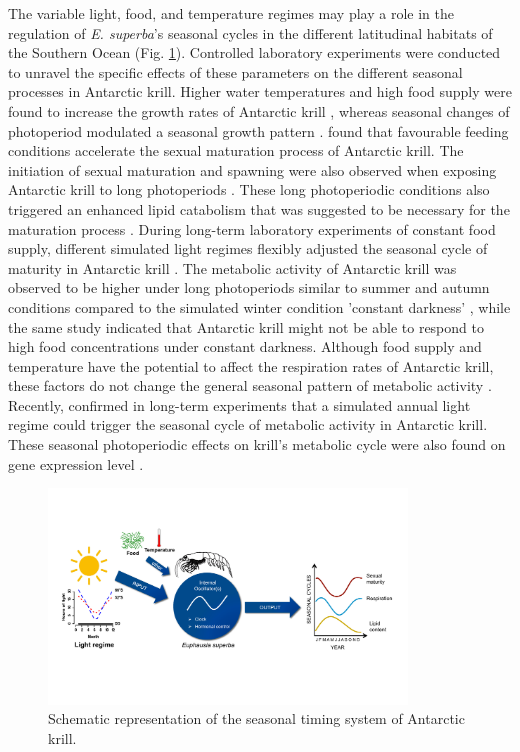 The variable light, food, and temperature regimes may play a role in the
regulation of \textit{E. superba}'s seasonal cycles in the different latitudinal
habitats of the Southern Ocean (Fig. \ref{figure3}). Controlled laboratory experiments were
conducted to unravel the specific effects of these parameters on the different
seasonal processes in Antarctic krill. Higher water temperatures and high food
supply were found to increase the growth rates of Antarctic krill \citep{brown_temperature_2010, bucht_isolation_1991}, whereas seasonal changes of photoperiod modulated a
seasonal growth pattern \citep{piccolin_photoperiodic_2018}. \citet{kawaguchi_male_2007} found
that favourable feeding conditions accelerate the sexual maturation process of
Antarctic krill. The initiation of sexual maturation and spawning were also
observed when exposing Antarctic krill to long photoperiods \citep{hirano_antarctic_2003, teschke_effects_2008}. These long photoperiodic conditions also triggered
an enhanced lipid catabolism that was suggested to be necessary for the
maturation process \citep{teschke_effects_2008}. During long-term laboratory
experiments of constant food supply, different simulated light regimes flexibly
adjusted the seasonal cycle of maturity in Antarctic krill \citep{brown_flexible_2011}. The metabolic activity of Antarctic krill was observed to be higher
under long photoperiods similar to summer and autumn conditions compared to the
simulated winter condition 'constant darkness' \citep{teschke_simulated_2007}, while
the same study indicated that Antarctic krill might not be able to respond to
high food concentrations under constant darkness. Although food supply and
temperature have the potential to affect the respiration rates of Antarctic
krill, these factors do not change the general seasonal pattern of metabolic
activity \citep{brown_long-term_2013}. Recently, \citet{piccolin_photoperiodic_2018} confirmed in
long-term experiments that a simulated annual light regime could trigger the
seasonal cycle of metabolic activity in Antarctic krill. These seasonal
photoperiodic effects on krill's metabolic cycle were also found on gene
expression level \citep{piccolin_photoperiodic_2018, seear_effects_2009}.


\begin{figure}
        \centering
        \includegraphics[width=0.85\textwidth]{../Figures/Figure3.pdf}
        \caption{Schematic representation of the seasonal timing system of Antarctic krill.}
        \label{figure3}
\end{figure}


